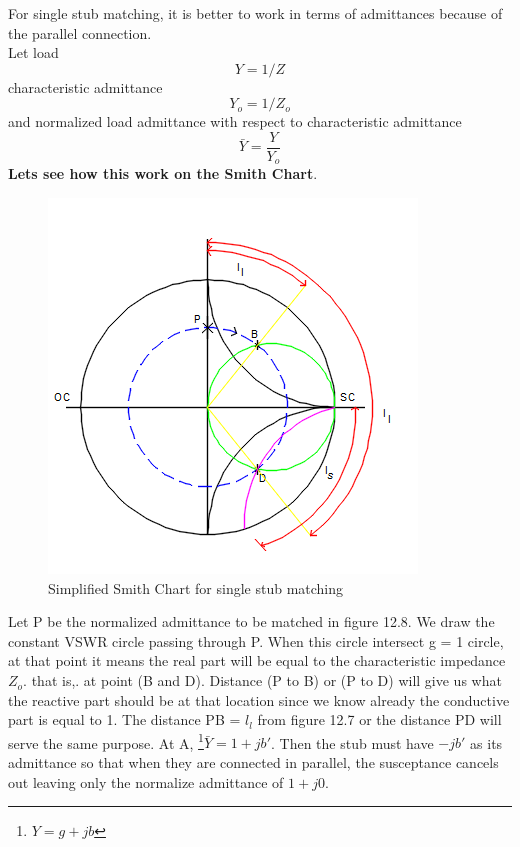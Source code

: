 For single stub matching, it is better to work in terms of admittances because of the parallel connection.\\
Let load 
\begin{equation}
Y = 1/Z
\end{equation}
characteristic admittance 
\begin{equation} Y_o = 1/Z_o\end{equation} 
and normalized load admittance with respect to characteristic admittance 
\begin{equation} 
\bar{Y}=\frac{Y}{Y_o} 
\end{equation}
\textbf{Lets see how this work on the Smith Chart}. %
\begin{figure}[h]
\centering
\includegraphics[width=1\linewidth]{./graphics/qwtch}
\caption{Simplified Smith Chart for single stub matching}
\end{figure}
Let P be the normalized admittance to be matched in figure 12.8. We draw the constant VSWR circle passing through P. When this circle intersect g = 1 circle, at that point it means the real part will be equal to the characteristic impedance $Z_o$. that is,. at point (B and D). Distance (P to B) or (P to D) will give us what the reactive
part should be at that location since we know already the conductive part is equal to 1. The distance PB = $l_l$ from figure 12.7 or the distance PD will serve the same purpose. At A, \footnote{$Y = g + jb$}$\bar{Y} = 1 + jb' $. Then the stub must have $-jb'$ as its admittance so that when they are connected in parallel, the susceptance cancels out leaving only the normalize admittance of $1 + j0$.
